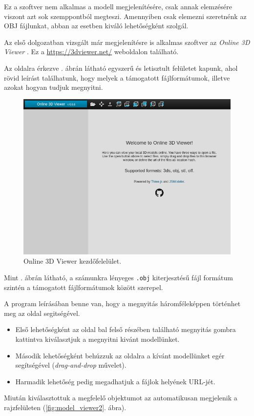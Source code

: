 Ez a szoftver nem alkalmas a modell megjelenítésére, csak annak elemzésére viszont azt sok szemppontból megteszi. Amennyiben csak elemezni szeretnénk az OBJ fájlunkat, abban az esetben kiváló lehetőségként szolgál.


Az első dolgozatban vizsgált már megjelenítésre is alkalmas szoftver az \textit{Online 3D Viewer} \cite{online2014viktor}.
Ez a \url{https://3dviewer.net/} weboldalon található.

Az oldalra érkezve . ábrán látható egyszerű és letisztult felületet kapunk, ahol rövid leírást találhatunk, hogy melyek a támogatott fájlformátumok, illetve azokat hogyan tudjuk megnyitni.

\begin{figure}[h]
\centering
\includegraphics[width=\textwidth]{images/Model_Viewer.png}
\caption{Online 3D Viewer kezdőfelelület.}
\label{fig:model_viewer1}
\end{figure}

Mint . ábrán látható, a számunkra lényeges \texttt{.obj} kiterjesztésű fájl formátum szintén a támogatott fájlformátumok között szerepel.

A program leírásában benne van, hogy a megnyitás háromféleképpen történhet meg az oldal segitségével.
\begin{itemize}
\item Első lehetőségként az oldal bal felső részében található megnyitás gombra kattintva kiválasztjuk a megnyitni kivánt modellünket.
\item Második lehetőségként behúzzuk az oldalra a kívánt modellünket egér segítségével (\textit{drag-and-drop} művelet).
\item Harmadik lehetőség pedig megadhatjuk a fájlok helyének URL-jét.
\end{itemize}
Miután kiválasztottuk a megfelelő objektumot az automatikusan megjelenik a rajzfelületen  (\ref{fig:model_viewer2}. ábra).

